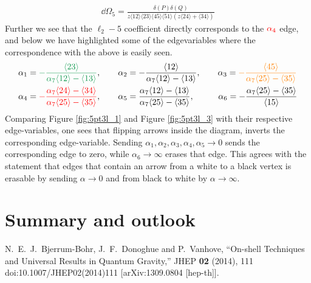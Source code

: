\documentclass[letter,11pt]{article}
\newcommand{\ab}[1]{\langle #1 \rangle}
\begin{document}
\begin{equation}
	\begin{aligned}
	\dd \Omega_5=\frac{\delta(P)\delta(Q)}{z \ab{12}\ab{23}\ab{45}\ab{51}\left(z\ab{24}+\ab{34}\right)}
	\end{aligned}
\end{equation}
Further we see that the $\ell_2-5$ coefficient directly corresponds to the $\textcolor{red}{\alpha_4}$ edge, and below we have highlighted some of the edgevariables where the correspondence with the above is easily seen.
\begin{equation}
	\begin{aligned}
		\alpha_1&=\textcolor{ForestGreen}{-\frac{\ab{23}}{\alpha_7\ab{12}-\ab{13}}},~~~~~~
		\alpha_2=-\frac{\ab{12}}{\alpha_7\ab{12}-\ab{13}},~~~~~~
		\alpha_3=\textcolor{orange}{-\frac{\ab{45}}{\alpha_7\ab{25}-\ab{35}}}\\
		\alpha_4&=\textcolor{red}{-\frac{\alpha_7\ab{24}-\ab{34}}{\alpha_7\ab{25}-\ab{35}}}
		,~~~~~~
		\alpha_5=\frac{\alpha_7\ab{12}-\ab{13}}{\alpha_7\ab{25}-\ab{35}}
		,~~~~~~~~\,
		\alpha_6=-\frac{\alpha_7\ab{25}-\ab{35}}{\ab{15}}
	\end{aligned}
\end{equation}
Comparing Figure \ref{fig:5pt3l_1} and Figure \ref{fig:5pt3l_3} with their respective edge-variables, one sees that flipping arrows inside the diagram, inverts the corresponding edge-variable. Sending $\alpha_1,\alpha_2,\alpha_3,\alpha_4,\alpha_5\to 0$ sends the corresponding edge to zero, while $\alpha_6\to\infty $ erases that edge. This agrees with the statement that edges that contain an arrow from a white to a black vertex is erasable by sending $\alpha\to 0$ and from black to white by $\alpha\to \infty$.
\newpage
\section{Summary and outlook}
\appendix
\begin{thebibliography}{99}
N.~E.~J.~Bjerrum-Bohr, J.~F.~Donoghue and P.~Vanhove,
``On-shell Techniques and Universal Results in Quantum Gravity,''
JHEP \textbf{02} (2014), 111
doi:10.1007/JHEP02(2014)111
[arXiv:1309.0804 [hep-th]].

\end{thebibliography}
\end{document}
